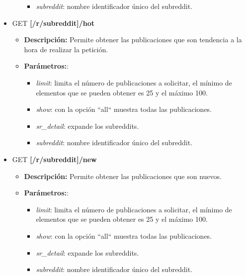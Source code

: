 \documentclass[../../main.tex]{subfiles}
\begin{document}
\begin{itemize}
\begin{itemize}
\begin{itemize}
            \item  \textit{subreddit}: nombre identificador único del subreddit.
        \end{itemize}
    \end{itemize}
    
    \item GET \textbf{[/r/subreddit]/hot}
    \begin{itemize}
        \item \textbf{Descripción:} Permite obtener las publicaciones que son tendencia a la hora de realizar la petición.
        \item \textbf{Parámetros:}:
        \begin{itemize}
            \item  \textit{limit}: limita el número de publicaciones a solicitar, el mínimo de elementos que se pueden obtener es 25 y el máximo 100.
            
            \item  \textit{show}: con la opción ``all`` muestra todas las publicaciones.
            
            \item  \textit{sr\_detail}: expande los subreddits.
            
            \item  \textit{subreddit}: nombre identificador único del subreddit.
        \end{itemize}
    \end{itemize}
    
    \item GET \textbf{[/r/subreddit]/new}
    \begin{itemize}
        \item \textbf{Descripción:} Permite obtener las publicaciones que son nuevos.
        \item \textbf{Parámetros:}:
        \begin{itemize}
            \item  \textit{limit}: limita el número de publicaciones a solicitar, el mínimo de elementos que se pueden obtener es 25 y el máximo 100.
            
            \item  \textit{show}: con la opción ``all`` muestra todas las publicaciones.
            
            \item  \textit{sr\_detail}: expande los subreddits.
            
            \item  \textit{subreddit}: nombre identificador único del subreddit.
        \end{itemize}
    \end{itemize}
    

\end{itemize}
\end{document}
